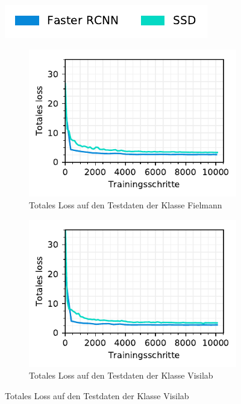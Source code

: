 \begin{figure}[h!] 
  \captionsetup{width=.9\linewidth}
  \label{fig:specific-ie:loss}
  \caption{Totales Loss auf den Testdaten der Leistungserbringer spezifischen Modelle}
  \centering
  \includegraphics[scale=1]{graphics/matplot/img-detection__legend_1.pdf}
  \begin{subfigure}[b]{0.5\linewidth}
    \captionsetup{width=.9\linewidth}
    \centering
    \includegraphics[scale=1]{graphics/matplot/img-detection__fielmann__loss.pdf}
    \caption{Totales Loss auf den Testdaten der Klasse Fielmann} 
    \label{fig:specific-ie:fielmann:loss}
    \vspace{2ex}
  \end{subfigure}%
  \begin{subfigure}[b]{0.5\linewidth}
    \captionsetup{width=.9\linewidth}
    \centering
    \includegraphics[scale=1]{graphics/matplot/img-detection__visilab__loss.pdf}
    \caption{Totales Loss auf den Testdaten der Klasse Visilab} 
    \label{fig:specific-ie:visilab:loss}
    \vspace{2ex}
  \end{subfigure} 
\end{figure}

